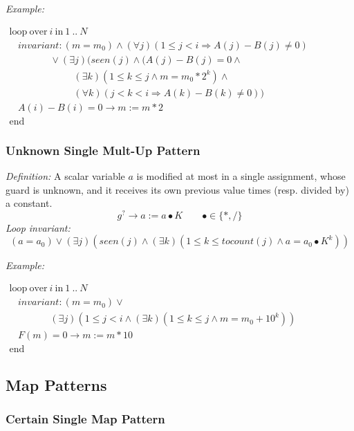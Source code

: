 \documentclass[a4paper,10pt]{article}
\newcommand{\KWloop}{\ensuremath{\mathrm{loop}~}}
\newcommand{\KWend}{\ensuremath{\mathrm{end}~}}
\newcommand{\KWover}{\ensuremath{\mathrm{over}~}}
\newcommand{\KWin}{\ensuremath{~\mathrm{in}~}}
\newcommand{\impl}{\ensuremath{\Longrightarrow}}
\newcommand{\seen}[1]{\ensuremath{\mathit{seen}(#1)}\xspace}
\newcommand{\tocount}[1]{\ensuremath{\mathit{tocount}(#1)}\xspace}
\newcommand{\loopinvariant}{\noindent\textit{Loop invariant:}\xspace}
\newcommand{\patterndef}{\noindent\textit{Definition:}\xspace}
\newcommand{\patternexample}{\noindent\textit{Example:}\xspace}
\begin{document}
\bigskip
\patternexample

\medskip
$\begin{array}{l}
  \KWloop \KWover i \KWin 1~..~N \\
  ~~~~ \textit{invariant}: (m = m_0) \land (\forall j)(1 \leq j < i \impl A(j)-B(j)\neq0)\\
  ~~~~~~~~~~~~~~~~~~~ \lor (\exists j)(\seen{j} \land (A(j)-B(j)= 0 \land \\
  ~~~~~~~~~~~~~~~~~~~~~~~~~~~~~~ (\exists k)(1 \leq k \leq j \land m = m_0 * 2^k) \land\\
  ~~~~~~~~~~~~~~~~~~~~~~~~~~~~~~ (\forall k)(j < k < i \impl A(k)-B(k)\neq0))\\
  ~~~~ A(i)-B(i)=0 \rightarrow m := m*2\\
  \KWend
\end{array}$

\subsubsection*{Unknown Single Mult-Up Pattern}

\patterndef A scalar variable $a$ is modified at most in a single assignment, whose
guard is unknown, and it receives its own previous value times
(resp. divided by) a constant.
%
$$g^? \rightarrow a := a \bullet K  \qquad \bullet \in \{*, / \}$$
%
\loopinvariant
%
$$(a = a_0) \lor (\exists j)(\seen{j} \land (\exists k)(1 \leq k \leq \tocount{j} \land a = a_0 \bullet K^k))$$

\bigskip
\patternexample

\medskip
$\begin{array}{l}
  \KWloop \KWover i \KWin 1~..~N \\
  ~~~~ \textit{invariant}: (m = m_0) \lor \\
  ~~~~~~~~~~~~~~~~~~~ (\exists j)(1 \leq j < i \land (\exists k)(1 \leq k \leq j \land m = m_0+10^k))\\
  ~~~~ F(m)=0 \rightarrow m := m*10\\
  \KWend
\end{array}$

\subsection{Map Patterns}

\subsubsection*{Certain Single Map Pattern}
\end{document}
